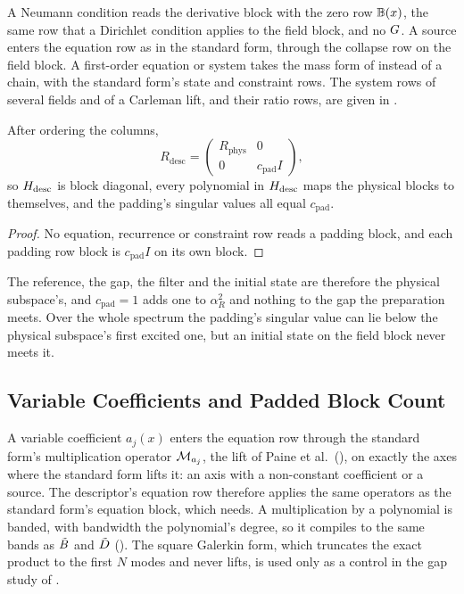 A Neumann condition reads the derivative block with the zero row $\mathbb{B}(x)$, the same row that a Dirichlet condition applies to the field block, and no $G$. A source enters the equation row as in the standard form, through the collapse row on the field block. A first-order equation or system takes the mass form of  instead of a chain, with the standard form's state and constraint rows. The system rows of several fields and of a Carleman lift, and their ratio rows, are given in .

\begin{proposition}
\label{prop:padding-decouples}
After ordering the columns,
\begin{equation*}
    R_{\mathrm{desc}}=\begin{pmatrix}R_{\mathrm{phys}}&0\\0&c_{\mathrm{pad}}I\end{pmatrix},
\end{equation*}
so $H_{\mathrm{desc}}$ is block diagonal, every polynomial in $H_{\mathrm{desc}}$ maps the physical blocks to themselves, and the padding's singular values all equal $c_{\mathrm{pad}}$.
\end{proposition}
\begin{proof}
No equation, recurrence or constraint row reads a padding block, and each padding row block is $c_{\mathrm{pad}}I$ on its own block.
\end{proof}

The reference, the gap, the filter and the initial state are therefore the physical subspace's, and $c_{\mathrm{pad}}=1$ adds one to $\alpha_R^2$ and nothing to the gap the preparation meets. Over the whole spectrum the padding's singular value can lie below the physical subspace's first excited one, but an initial state on the field block never meets it.

\subsection{Variable Coefficients and Padded Block Count}
\label{sec:app-variable-coeff}

A variable coefficient $a_j(x)$ enters the equation row through the standard form's multiplication operator $\mathcal{M}_{a_j}$, the lift of Paine et al.\ (), on exactly the axes where the standard form lifts it: an axis with a non-constant coefficient or a source. The descriptor's equation row therefore applies the same operators as the standard form's equation block, which  needs. A multiplication by a polynomial is banded, with bandwidth the polynomial's degree, so it compiles to the same bands as $\tilde{B}$ and $\tilde{D}$ (). The square Galerkin form, which truncates the exact product to the first $N$ modes and never lifts, is used only as a control in the gap study of .

